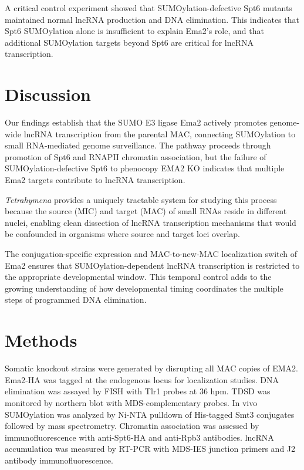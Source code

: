 \documentclass[11pt]{article}
\begin{document}
A critical control experiment showed that SUMOylation-defective Spt6 mutants maintained normal lncRNA production and DNA elimination. This indicates that Spt6 SUMOylation alone is insufficient to explain Ema2's role, and that additional SUMOylation targets beyond Spt6 are critical for lncRNA transcription.

\section{Discussion}

Our findings establish that the SUMO E3 ligase Ema2 actively promotes genome-wide lncRNA transcription from the parental MAC, connecting SUMOylation to small RNA-mediated genome surveillance. The pathway proceeds through promotion of Spt6 and RNAPII chromatin association, but the failure of SUMOylation-defective Spt6 to phenocopy EMA2 KO indicates that multiple Ema2 targets contribute to lncRNA transcription.

\textit{Tetrahymena} provides a uniquely tractable system for studying this process because the source (MIC) and target (MAC) of small RNAs reside in different nuclei, enabling clean dissection of lncRNA transcription mechanisms that would be confounded in organisms where source and target loci overlap.

The conjugation-specific expression and MAC-to-new-MAC localization switch of Ema2 ensures that SUMOylation-dependent lncRNA transcription is restricted to the appropriate developmental window. This temporal control adds to the growing understanding of how developmental timing coordinates the multiple steps of programmed DNA elimination.

\section{Methods}

Somatic knockout strains were generated by disrupting all MAC copies of EMA2. Ema2-HA was tagged at the endogenous locus for localization studies. DNA elimination was assayed by FISH with Tlr1 probes at 36 hpm. TDSD was monitored by northern blot with MDS-complementary probes. In vivo SUMOylation was analyzed by Ni-NTA pulldown of His-tagged Smt3 conjugates followed by mass spectrometry. Chromatin association was assessed by immunofluorescence with anti-Spt6-HA and anti-Rpb3 antibodies. lncRNA accumulation was measured by RT-PCR with MDS-IES junction primers and J2 antibody immunofluorescence.



\end{document}
